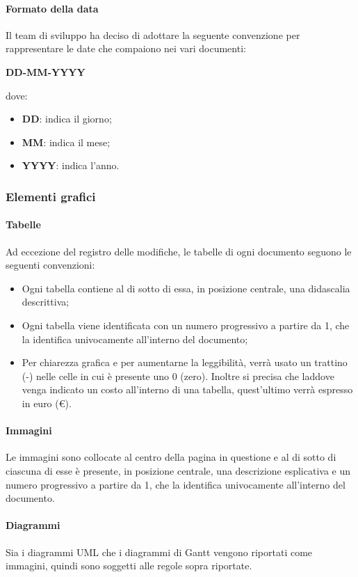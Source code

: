 \paragraph{Formato della data}
Il team di sviluppo ha deciso di adottare la seguente convenzione per rappresentare le date che compaiono nei vari documenti:
\begin{center}
    \large{\textbf{DD-MM-YYYY}}
\end{center}
dove:
\begin{itemize}
    \item \textbf{DD}: indica il giorno;
    \item \textbf{MM}: indica il mese;
    \item \textbf{YYYY}: indica l'anno.
\end{itemize}

\subsubsection{Elementi grafici}
\paragraph{Tabelle}
Ad eccezione del registro delle modifiche, le tabelle di ogni documento seguono le seguenti convenzioni:
\begin{itemize}
    \item Ogni tabella contiene al di sotto di essa, in posizione centrale, una didascalia descrittiva;
    \item Ogni tabella viene identificata con un numero progressivo a partire da 1, che la identifica univocamente all'interno del documento;
    \item Per chiarezza grafica e per aumentarne la leggibilità, verrà usato un trattino (-) nelle celle in cui è presente uno 0 (zero). Inoltre si precisa che laddove venga indicato un costo all'interno di una tabella, quest'ultimo verrà espresso in euro (€).
\end{itemize}
\paragraph{Immagini}
Le immagini sono collocate al centro della pagina in questione e al di sotto di ciascuna di esse è presente, in posizione centrale, una descrizione esplicativa e un numero progressivo a partire da 1, che la identifica univocamente all'interno del documento.
\paragraph{Diagrammi}
Sia i diagrammi UML\glo{} che i diagrammi di Gantt\glo{} vengono riportati come immagini, quindi sono soggetti alle regole sopra riportate.
